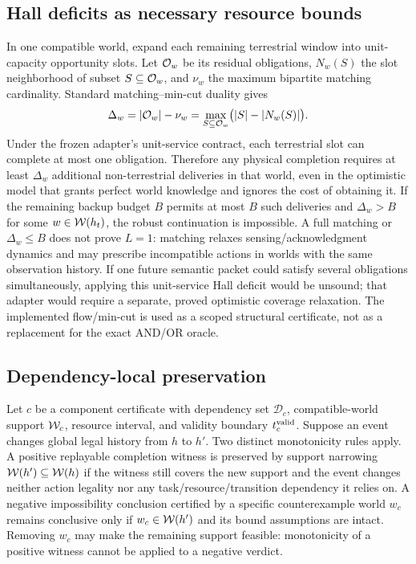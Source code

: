 \subsection{Hall deficits as necessary resource bounds}
In one compatible world, expand each remaining terrestrial window into unit-capacity opportunity slots. Let $\mathcal{O}_w$ be its residual obligations, $N_w(S)$ the slot neighborhood of subset $S\subseteq\mathcal{O}_w$, and $\nu_w$ the maximum bipartite matching cardinality. Standard matching--min-cut duality gives
\begin{equation}
\Delta_w=|\mathcal{O}_w|-\nu_w
=\max_{S\subseteq\mathcal{O}_w}\bigl(|S|-|N_w(S)|\bigr).
\end{equation}
Under the frozen adapter's unit-service contract, each terrestrial slot can complete at most one obligation. Therefore any physical completion requires at least $\Delta_w$ additional non-terrestrial deliveries in that world, even in the optimistic model that grants perfect world knowledge and ignores the cost of obtaining it. If the remaining backup budget $B$ permits at most $B$ such deliveries and $\Delta_w>B$ for some $w\in\mathcal{W}(h_t)$, the robust continuation is impossible. A full matching or $\Delta_w\le B$ does not prove $L=1$: matching relaxes sensing/acknowledgment dynamics and may prescribe incompatible actions in worlds with the same observation history. If one future semantic packet could satisfy several obligations simultaneously, applying this unit-service Hall deficit would be unsound; that adapter would require a separate, proved optimistic coverage relaxation. The implemented flow/min-cut is used as a scoped structural certificate, not as a replacement for the exact AND/OR oracle.

\subsection{Dependency-local preservation}
Let $c$ be a component certificate with dependency set $\mathcal D_c$, compatible-world support $\mathcal{W}_c$, resource interval, and validity boundary $t_c^{\rm valid}$. Suppose an event changes global legal history from $h$ to $h'$. Two distinct monotonicity rules apply. A positive replayable completion witness is preserved by support narrowing $\mathcal{W}(h')\subseteq\mathcal{W}(h)$ if the witness still covers the new support and the event changes neither action legality nor any task/resource/transition dependency it relies on. A negative impossibility conclusion certified by a specific counterexample world $w_c$ remains conclusive only if $w_c\in\mathcal{W}(h')$ and its bound assumptions are intact. Removing $w_c$ may make the remaining support feasible: monotonicity of a positive witness cannot be applied to a negative verdict.

